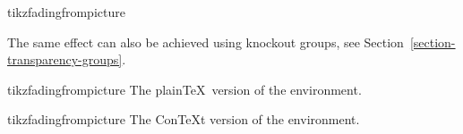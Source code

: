 \begin{environment}{{tikzfadingfrompicture}}
\begin{codeexample}[preamble={\usetikzlibrary{fadings,patterns}},pre={\begin{lateximage}},post={\end{lateximage}},svg]
\end{codeexample}

    The same effect can also be achieved using knockout groups, see
    Section~\ref{section-transparency-groups}.
\end{environment}

\begin{plainenvironment}{{tikzfadingfrompicture}}
    The plain\TeX\ version of the environment.
\end{plainenvironment}

\begin{contextenvironment}{{tikzfadingfrompicture}}
    The Con\TeX t version of the environment.
\end{contextenvironment}

